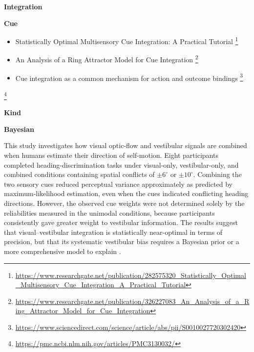 \documentclass{book}
\providecommand{\ProjectDeepHeading}[2]{%
    \par\medskip\noindent\textbf{#2}\par\smallskip
}
\providecommand{\seeherefooter}[1]{\footnote{\url{#1}}}
\begin{document}
\ProjectDeepHeading{4}{Integration}

\ProjectDeepHeading{5}{Cue}


\begin{itemize}
        \item Statistically Optimal Multisensory Cue Integration: A Practical Tutorial \seeherefooter{https://www.researchgate.net/publication/282575320_Statistically_Optimal_Multisensory_Cue_Integration_A_Practical_Tutorial}
        \item An Analysis of a Ring Attractor Model for Cue Integration \seeherefooter{https://www.researchgate.net/publication/326227083_An_Analysis_of_a_Ring_Attractor_Model_for_Cue_Integration}
        \item Cue integration as a common mechanism for action and outcome bindings \seeherefooter{https://www.sciencedirect.com/science/article/abs/pii/S0010027720302420}
    \end{itemize}
    \seeherefooter{https://pmc.ncbi.nlm.nih.gov/articles/PMC3130032/}

\ProjectDeepHeading{5}{Kind}

\ProjectDeepHeading{6}{Bayesian}


This study investigates how visual optic-flow and vestibular signals are combined when humans estimate their direction of self-motion. Eight participants completed heading-discrimination tasks under visual-only, vestibular-only, and combined conditions containing spatial conflicts of $\pm 6^{\circ}$ or $\pm 10^{\circ}$.
    Combining the two sensory cues reduced perceptual variance approximately as predicted by maximum-likelihood estimation, even when the cues indicated conflicting heading directions. However, the observed cue weights were not determined solely by the reliabilities measured in the unimodal conditions, because participants consistently gave greater weight to vestibular information. The results suggest that visual--vestibular integration is statistically near-optimal in terms of precision, but that its systematic vestibular bias requires a Bayesian prior or a more comprehensive model to explain \cite{butler-2010-bayesian-integration-of-visual-and-vestibular-signals-for-heading}.
\end{document}
